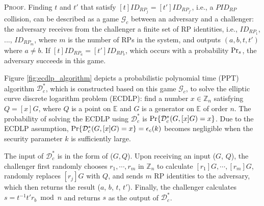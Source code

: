 \oldc
\vspace{0.75mm}
\noindent\textsc{Proof.}
Finding $t$ and $t'$ that satisfy $[t]ID_{RP_j} = [t']ID_{RP_{j'}}$, i.e., a $PID_{RP}$ collision, can be described as a game $\mathcal{G}_c$ between an adversary and a challenger: the adversary receives from the challenger a finite set of RP identities, i.e., $ID_{RP_1}$, ..., $ID_{RP_m}$, where $m$ is the number of RPs in the system, and outputs $(a, b, t, t')$ where $a \neq b$. If $[t]ID_{RP_a}=[t']ID_{RP_b}$, which occurs with a probability ${\rm Pr}_s$, the adversary succeeds in this game.

Figure \ref{fig:ecdlp_algorithm} depicts a probabilistic polynomial time (PPT) algorithm $\mathcal{D}^*_c$, which is constructed based on this game $\mathcal{G}_c$, to solve the elliptic curve discrete logarithm problem (ECDLP): find a number $x \in \mathbb{Z}_n$ satisfying $Q = [x]G$,
where $Q$ is a point on $\mathbb{E}$ and $G$ is a generator on $\mathbb{E}$ of order $n$.
The probability of solving the ECDLP using $\mathcal{D}^*_c$ is ${\rm Pr}\{\mathcal{D}^*_c(G, [x]G)=x\}$.
Due to the ECDLP assumption,
    ${\rm Pr}\{\mathcal{D}^*_c(G, [x]G)=x\} = \epsilon_{c}(k)$ becomes negligible when the security parameter $k$ is sufficiently large.



The input of $\mathcal{D}^*_c$ is in the form of ($G, Q$). Upon receiving an input ($G$, $Q$), the challenger first randomly chooses $r_1, \cdots, r_m$ in $\mathbb{Z}_n$ to calculate $[r_1]G, \cdots, [r_m]G$, randomly replaces $[r_j]G$ with $Q$, and sends $m$ RP identities to the adversary, which then returns the result ($a$, $b$, $t$, $t'$). Finally, the challenger calculates $s = t^{-1}t'r_b \bmod n$ and returns $s$ as the output of $\mathcal{D}^*_c$.

